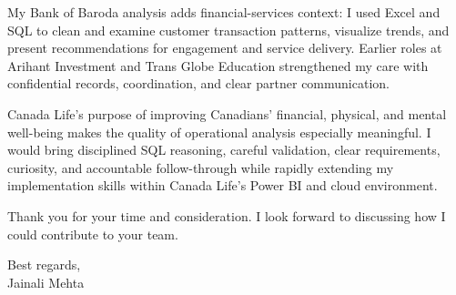 \documentclass[letterpaper,11pt]{article}
\begin{document}
\bigbreak
My Bank of Baroda analysis adds financial-services context: I used Excel and SQL to clean and examine customer transaction patterns, visualize trends, and present recommendations for engagement and service delivery. Earlier roles at Arihant Investment and Trans Globe Education strengthened my care with confidential records, coordination, and clear partner communication.

\bigbreak
Canada Life's purpose of improving Canadians' financial, physical, and mental well-being makes the quality of operational analysis especially meaningful. I would bring disciplined SQL reasoning, careful validation, clear requirements, curiosity, and accountable follow-through while rapidly extending my implementation skills within Canada Life's Power BI and cloud environment.

\bigbreak
Thank you for your time and consideration. I look forward to discussing how I could contribute to your team.

\bigbreak
Best regards,\\
Jainali Mehta
\end{document}
